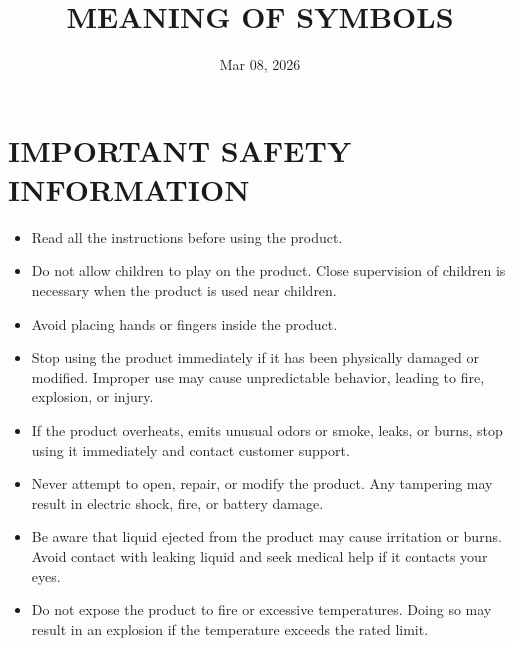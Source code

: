 \documentclass[a4paper,10pt,twoside,openany,english]{sphinxhowto}
\title{MEANING OF SYMBOLS}
\date{Mar 08, 2026}
\author{}
\begin{document}
\pagestyle{empty}
\sphinxmaketitle
\pagestyle{plain}

\pagestyle{normal}
\label{\detokenize{index::doc}}

\clearpage
{}
\setcounter{page}{1}


\section{IMPORTANT SAFETY INFORMATION}


\begin{safetytwocol}

\begin{itemize}
\item {} 
\sphinxAtStartPar
Read all the instructions before using the product.

\item {} 
\sphinxAtStartPar
Do not allow children to play on the product. Close supervision of children is necessary when the product is used near children.

\item {} 
\sphinxAtStartPar
Avoid placing hands or fingers inside the product.

\item {} 
\sphinxAtStartPar
Stop using the product immediately if it has been physically damaged or modified. Improper use may cause unpredictable behavior, leading to fire, explosion, or injury.

\item {} 
\sphinxAtStartPar
If the product overheats, emits unusual odors or smoke, leaks, or burns, stop using it immediately and contact customer support.

\item {} 
\sphinxAtStartPar
Never attempt to open, repair, or modify the product. Any tampering may result in electric shock, fire, or battery damage.

\item {} 
\sphinxAtStartPar
Be aware that liquid ejected from the product may cause irritation or burns. Avoid contact with leaking liquid and seek medical help if it contacts your eyes.

\item {} 
\sphinxAtStartPar
Do not expose the product to fire or excessive temperatures. Doing so may result in an explosion if the temperature exceeds the rated limit.


\end{itemize}
\end{safetytwocol}
\end{document}
